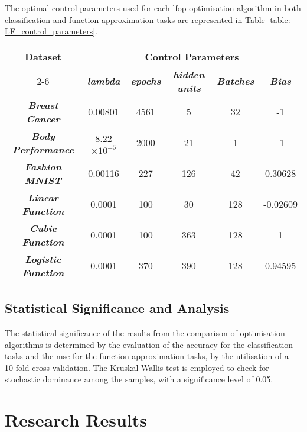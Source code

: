 \documentclass[10pt, conference]{IEEEtran}
\begin{document}
The optimal control parameters used for each \acrshort{lfop} optimisation algorithm in both
classification and function approximation tasks are represented in Table
\ref{table: LF_control_parameters}.
\begin{table*}[h!]
    \caption{Leap Frog Optimisation Control Parameters}
    \begin{center}
        \begin{tabular}{|c||c|c|c|c|c|}
            \hline
            \textbf{Dataset}&\multicolumn{5}{|c|}{\textbf{Control Parameters}} \\
            \cline{2-6}
                        & \textbf{\textit{lambda}} & \textbf{\textit{epochs}} & \textbf{\textit{hidden units}} & \textbf{\textit{Batches}}& \textbf{\textit{Bias}}\\
            \hline
            \textbf{\textit{Breast Cancer}}  & 0.00801 & 4561 & 5 & 32 & -1\\
            \textbf{\textit{Body Performance}}  & 8.22$\times10^{-5}$ & 2000 & 21 & 1 &-1\\
            \textbf{\textit{Fashion MNIST}} & 0.00116 & 227 & 126 & 42 & 0.30628\\
            \textbf{\textit{Linear Function}} & 0.0001 & 100 & 30 & 128 &-0.02609\\
            \textbf{\textit{Cubic Function}} & 0.0001 & 100 & 363 & 128 &1\\
            \textbf{\textit{Logistic Function}} & 0.0001 & 370 & 390 & 128 &0.94595\\
            \hline
        \end{tabular}
    \end{center}
    \label{table: LF_control_parameters}
\end{table*}

\subsection{Statistical Significance and Analysis}

The statistical significance of the results from the comparison of optimisation algorithms
is determined by the evaluation of the accuracy for the classification tasks and the \acrshort{mse}
for the function approximation tasks, by the utilisation of a 10-fold cross validation. The
Kruskal-Wallis test is employed to check for stochastic dominance among the samples, with a
significance level of 0.05.

\section{Research Results} \label{section: Research Results}
\end{document}
